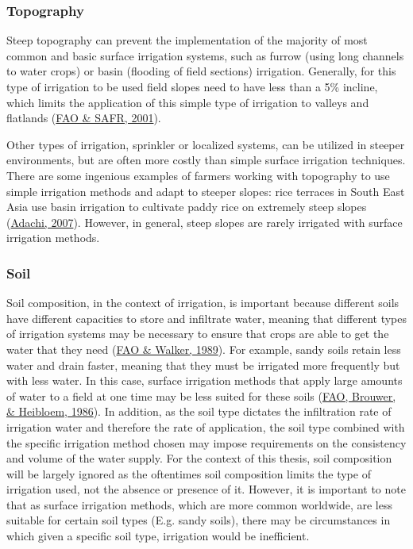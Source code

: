 \documentclass[12pt,twoside]{reedthesis}
\begin{document}
\hypertarget{topo}{%
\subsubsection{Topography}\label{topo}}

Steep topography can prevent the implementation of the majority of most common and basic surface irrigation systems, such as furrow (using long channels to water crops) or basin (flooding of field sections) irrigation. Generally, for this type of irrigation to be used field slopes need to have less than a 5\% incline, which limits the application of this simple type of irrigation to valleys and flatlands (\protect\hyperlink{ref-faoIrrigationManualPlanning2001}{FAO \& SAFR, 2001}).

Other types of irrigation, sprinkler or localized systems, can be utilized in steeper environments, but are often more costly than simple surface irrigation techniques. There are some ingenious examples of farmers working with topography to use simple irrigation methods and adapt to steeper slopes: rice terraces in South East Asia use basin irrigation to cultivate paddy rice on extremely steep slopes (\protect\hyperlink{ref-adachiAgriculturalTechnologiesTerraced2007}{Adachi, 2007}). However, in general, steep slopes are rarely irrigated with surface irrigation methods.

\hypertarget{soil}{%
\subsubsection{Soil}\label{soil}}

Soil composition, in the context of irrigation, is important because different soils have different capacities to store and infiltrate water, meaning that different types of irrigation systems may be necessary to ensure that crops are able to get the water that they need (\protect\hyperlink{ref-faoGuidelinesDesigningEvaluating1989}{FAO \& Walker, 1989}). For example, sandy soils retain less water and drain faster, meaning that they must be irrigated more frequently but with less water. In this case, surface irrigation methods that apply large amounts of water to a field at one time may be less suited for these soils (\protect\hyperlink{ref-faoIrrigationWaterManagement1986a}{FAO, Brouwer, \& Heibloem, 1986}). In addition, as the soil type dictates the infiltration rate of irrigation water and therefore the rate of application, the soil type combined with the specific irrigation method chosen may impose requirements on the consistency and volume of the water supply. For the context of this thesis, soil composition will be largely ignored as the oftentimes soil composition limits the type of irrigation used, not the absence or presence of it. However, it is important to note that as surface irrigation methods, which are more common worldwide, are less suitable for certain soil types (E.g. sandy soils), there may be circumstances in which given a specific soil type, irrigation would be inefficient.
\end{document}
